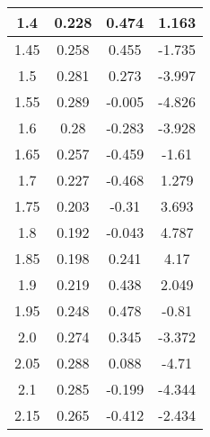 \begin{multicols}{2}
\begin{longtable}{|c|c|c|c|}
    \hline
    1.4      & 0.228        & 0.474                                  & 1.163                                        \\
    \hline
    1.45     & 0.258        & 0.455                                  & -1.735                                       \\
    \hline
    1.5      & 0.281        & 0.273                                  & -3.997                                       \\
    \hline
    1.55     & 0.289        & -0.005                                 & -4.826                                       \\
    \hline
    1.6      & 0.28         & -0.283                                 & -3.928                                       \\
    \hline
    1.65     & 0.257        & -0.459                                 & -1.61                                        \\
    \hline
    1.7      & 0.227        & -0.468                                 & 1.279                                        \\
    \hline
    1.75     & 0.203        & -0.31                                  & 3.693                                        \\
    \hline
    1.8      & 0.192        & -0.043                                 & 4.787                                        \\
    \hline
    1.85     & 0.198        & 0.241                                  & 4.17                                         \\
    \hline
    1.9      & 0.219        & 0.438                                  & 2.049                                        \\
    \hline
    1.95     & 0.248        & 0.478                                  & -0.81                                        \\
    \hline
    2.0      & 0.274        & 0.345                                  & -3.372                                       \\
    \hline
    2.05     & 0.288        & 0.088                                  & -4.71                                        \\
    \hline
    2.1      & 0.285        & -0.199                                 & -4.344                                       \\
    \hline
    2.15     & 0.265        & -0.412                                 & -2.434                                       \\

\end{longtable}
\end{multicols}
